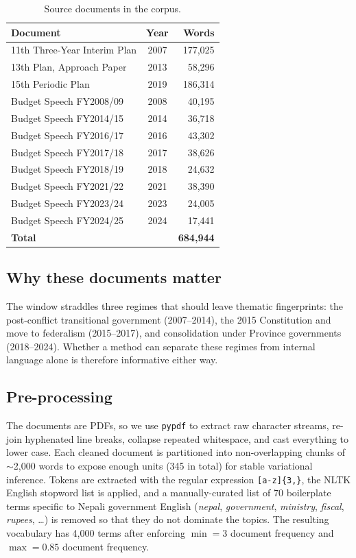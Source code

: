\documentclass[conference]{IEEEtran}
\begin{document}
\begin{table}[t]
\caption{Source documents in the corpus.}
\label{tab:corpus}
\centering
\small
\begin{tabular}{lcr}
\toprule
Document & Year & Words \\ \midrule
11th Three-Year Interim Plan & 2007 & 177{,}025 \\
13th Plan, Approach Paper    & 2013 &  58{,}296 \\
15th Periodic Plan           & 2019 & 186{,}314 \\ \midrule
Budget Speech FY2008/09      & 2008 &  40{,}195 \\
Budget Speech FY2014/15      & 2014 &  36{,}718 \\
Budget Speech FY2016/17      & 2016 &  43{,}302 \\
Budget Speech FY2017/18      & 2017 &  38{,}626 \\
Budget Speech FY2018/19      & 2018 &  24{,}632 \\
Budget Speech FY2021/22      & 2021 &  38{,}390 \\
Budget Speech FY2023/24      & 2023 &  24{,}005 \\
Budget Speech FY2024/25      & 2024 &  17{,}441 \\ \midrule
\textbf{Total}               &      & \textbf{684{,}944} \\
\bottomrule
\end{tabular}
\end{table}

\subsection{Why these documents matter}
The window straddles three regimes that should leave thematic
fingerprints: the post-conflict transitional government (2007--2014),
the 2015 Constitution and move to federalism (2015--2017), and
consolidation under Province governments (2018--2024).  Whether a
method can separate these regimes from internal language alone is
therefore informative either way.

\subsection{Pre-processing}
The documents are PDFs, so we use \texttt{pypdf} to extract raw
character streams, re-join hyphenated line breaks, collapse repeated
whitespace, and cast everything to lower case.  Each cleaned document
is partitioned into non-overlapping chunks of $\sim$2{,}000 words to
expose enough units (345 in total) for stable variational inference.
Tokens are extracted with the regular expression
\verb|[a-z]{3,}|, the NLTK English stopword list is applied, and a
manually-curated list of 70 boilerplate terms specific to Nepali
government English (\textit{nepal}, \textit{government},
\textit{ministry}, \textit{fiscal}, \textit{rupees}, \dots) is removed
so that they do not dominate the topics.  The resulting vocabulary
has 4{,}000 terms after enforcing $\min\!=\!3$ document frequency and
$\max\!=\!0.85$ document frequency.
\end{document}
